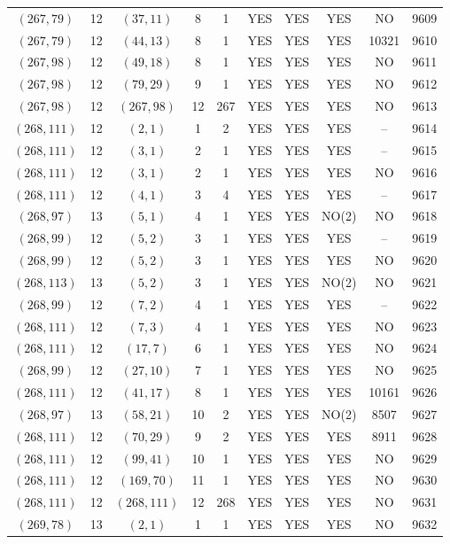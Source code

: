 \begin{longtable}{|c|c|c|c|c|c|c|c|c|c|}
$(267, 79)$ & 12 & $(37, 11)$ & 8 & 1 & YES & YES & YES & NO & 9609\\
$(267, 79)$ & 12 & $(44, 13)$ & 8 & 1 & YES & YES & YES & 10321 & 9610\\
$(267, 98)$ & 12 & $(49, 18)$ & 8 & 1 & YES & YES & YES & NO & 9611\\
$(267, 98)$ & 12 & $(79, 29)$ & 9 & 1 & YES & YES & YES & NO & 9612\\
$(267, 98)$ & 12 & $(267, 98)$ & 12 & 267 & YES & YES & YES & NO & 9613\\
$(268, 111)$ & 12 & $(2, 1)$ & 1 & 2 & YES & YES & YES & -- & 9614\\
$(268, 111)$ & 12 & $(3, 1)$ & 2 & 1 & YES & YES & YES & -- & 9615\\
$(268, 111)$ & 12 & $(3, 1)$ & 2 & 1 & YES & YES & YES & NO & 9616\\
$(268, 111)$ & 12 & $(4, 1)$ & 3 & 4 & YES & YES & YES & -- & 9617\\
$(268, 97)$ & 13 & $(5, 1)$ & 4 & 1 & YES & YES & NO(2) & NO & 9618\\
$(268, 99)$ & 12 & $(5, 2)$ & 3 & 1 & YES & YES & YES & -- & 9619\\
$(268, 99)$ & 12 & $(5, 2)$ & 3 & 1 & YES & YES & YES & NO & 9620\\
$(268, 113)$ & 13 & $(5, 2)$ & 3 & 1 & YES & YES & NO(2) & NO & 9621\\
$(268, 99)$ & 12 & $(7, 2)$ & 4 & 1 & YES & YES & YES & -- & 9622\\
$(268, 111)$ & 12 & $(7, 3)$ & 4 & 1 & YES & YES & YES & NO & 9623\\
$(268, 111)$ & 12 & $(17, 7)$ & 6 & 1 & YES & YES & YES & NO & 9624\\
$(268, 99)$ & 12 & $(27, 10)$ & 7 & 1 & YES & YES & YES & NO & 9625\\
$(268, 111)$ & 12 & $(41, 17)$ & 8 & 1 & YES & YES & YES & 10161 & 9626\\
$(268, 97)$ & 13 & $(58, 21)$ & 10 & 2 & YES & YES & NO(2) & 8507 & 9627\\
$(268, 111)$ & 12 & $(70, 29)$ & 9 & 2 & YES & YES & YES & 8911 & 9628\\
$(268, 111)$ & 12 & $(99, 41)$ & 10 & 1 & YES & YES & YES & NO & 9629\\
$(268, 111)$ & 12 & $(169, 70)$ & 11 & 1 & YES & YES & YES & NO & 9630\\
$(268, 111)$ & 12 & $(268, 111)$ & 12 & 268 & YES & YES & YES & NO & 9631\\
$(269, 78)$ & 13 & $(2, 1)$ & 1 & 1 & YES & YES & YES & NO & 9632\\

\end{longtable}
